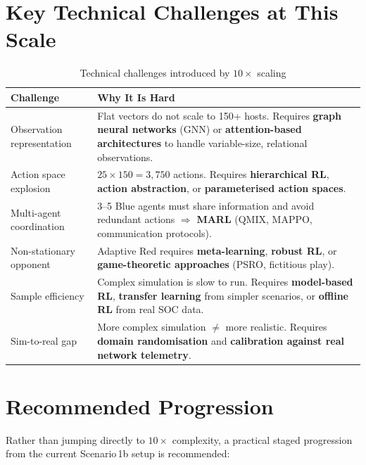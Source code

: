 \documentclass[11pt,a4paper]{article}
\begin{document}
\section{Key Technical Challenges at This Scale}

\begin{table}[h!]
\centering
\caption{Technical challenges introduced by $10\times$ scaling}
\label{tab:challenges}
\begin{tabularx}{\textwidth}{@{} l X @{}}
\toprule
\textbf{Challenge} & \textbf{Why It Is Hard} \\
\midrule
Observation representation &
    Flat vectors do not scale to 150+ hosts. Requires \textbf{graph neural
    networks} (GNN) or \textbf{attention-based architectures} to handle
    variable-size, relational observations. \\[4pt]
Action space explosion &
    $25 \times 150 = 3{,}750$ actions. Requires \textbf{hierarchical RL},
    \textbf{action abstraction}, or \textbf{parameterised action spaces}. \\[4pt]
Multi-agent coordination &
    3--5 Blue agents must share information and avoid redundant actions
    $\Rightarrow$ \textbf{MARL} (QMIX, MAPPO, communication protocols). \\[4pt]
Non-stationary opponent &
    Adaptive Red requires \textbf{meta-learning}, \textbf{robust RL}, or
    \textbf{game-theoretic approaches} (PSRO, fictitious play). \\[4pt]
Sample efficiency &
    Complex simulation is slow to run. Requires \textbf{model-based RL},
    \textbf{transfer learning} from simpler scenarios, or \textbf{offline RL}
    from real SOC data. \\[4pt]
Sim-to-real gap &
    More complex simulation $\neq$ more realistic. Requires
    \textbf{domain randomisation} and \textbf{calibration against real
    network telemetry}. \\
\bottomrule
\end{tabularx}
\end{table}

\section{Recommended Progression}

Rather than jumping directly to $10\times$ complexity, a practical staged
progression from the current Scenario\,1b setup is recommended:
\end{document}
